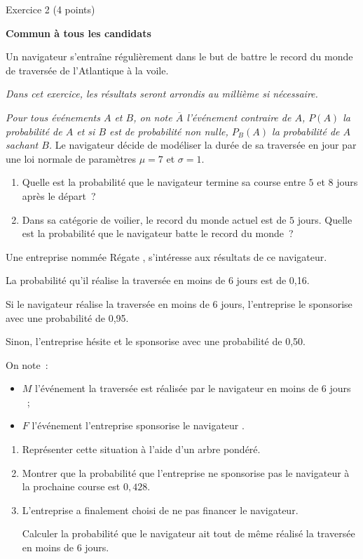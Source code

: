 
%
\begin{h2}Exercice 2 (4 points)\end{h2}
\par
\textbf{Commun  à tous les candidats}
\par
Un navigateur s'entraîne régulièrement dans le but de battre le record du monde de
traversée de l'Atlantique à la voile.
\par
\emph{Dans cet exercice, les résultats seront arrondis au millième si nécessaire.}
\par
\emph{Pour tous événements $A$ et $B$, on note $\overline{A}$ l'événement contraire de $A$, $P(A)$ la probabilité de $A$
et si $B$ est de probabilité non nulle, $P_B(A)$ la probabilité de $A$ sachant $B$.}
\bigbreak
{}
\medbreak
Le navigateur décide de modéliser la durée de sa traversée en jour par une loi normale de
paramètres $\mu = 7$ et $\sigma= 1$.
\medbreak
\begin{enumerate}
     \item Quelle est la probabilité que le navigateur termine sa course entre $5$ et $8$ jours après le départ~?
     \item Dans sa catégorie de voilier, le record du monde actuel est de $5$ jours.
     Quelle est la probabilité que le navigateur batte le record du monde~?
\end{enumerate}
\bigbreak
{}
\medbreak
Une entreprise nommée \og Régate \fg, s'intéresse aux résultats de ce navigateur.
\par
La probabilité qu'il réalise la traversée en moins de 6 jours est de 0,16.
\par
Si le navigateur réalise la traversée en moins de 6 jours, l'entreprise le sponsorise avec une probabilité de 0,95.
\par
Sinon, l'entreprise hésite et le sponsorise avec une probabilité de 0,50.
\par
On note~:
\begin{itemize}
     \item $M$ l'événement \og la traversée est réalisée par le navigateur en moins de 6 jours \fg~;
     \item $F$ l'événement \og l'entreprise sponsorise le navigateur \fg.
\end{itemize}
\begin{enumerate}
     \item Représenter cette situation à l'aide d'un arbre pondéré.
     \item  Montrer que la probabilité que l'entreprise ne sponsorise pas le navigateur à la
     prochaine course est $0,428$.
     \item  L'entreprise a finalement choisi de ne pas financer le navigateur.
     \par
     Calculer la probabilité que le navigateur ait tout de même réalisé la traversée en moins
     de $6$ jours.
\end{enumerate}
